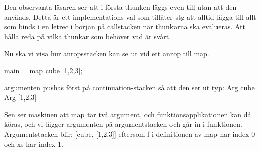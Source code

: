 \documentclass[../Core]{subfiles}
\begin{document}
Den observanta läsaren ser att i första thunken läggs even till utan att den används. Detta är ett implementations val som tillåter stg att alltid lägga till allt som binds i en letrec i början på callstacken när thunkarna ska evalueras. Att hålla reda på vilka thunkar som behöver vad är svårt.




Nu ska vi visa hur anropsstacken kan se ut vid ett anrop till map.


\begin{codeEx}
main = map cube [1,2,3];
\end{codeEx}


argumenten pushas först på continuation-stacken så att den ser ut typ:
Arg cube
Arg [1,2,3]

Sen ser maskinen att map tar två argument, och funktionsapplikationen kan då köras, och vi lägger argumenten
på argumentstacken och går in i funktionen. Argumentstacken blir:
[cube, [1,2,3]]
eftersom f i definitionen av map har index 0 och xs har index 1.
\end{document}
